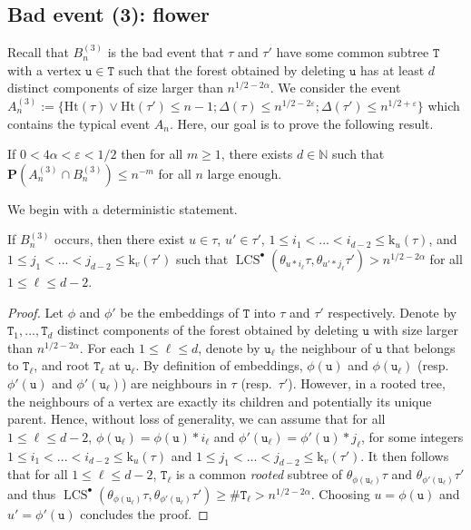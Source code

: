 \documentclass[11pt,reqno]{amsart}
\newcommand{\N}{\mathbb{N}}
\newcommand{\1}{\mathbf{1}}
\newcommand{\0}{\mathbf{0}}
\newcommand{\ttT}{\mathtt{T}}
\newcommand{\ttu}{\mathtt{u}}
\newcommand{\prob}{\mathbf{P}}
\newcommand{\Ht}{\mathrm{Ht}}
\newcommand{\rk}{\mathrm{k}}
\newcommand{\LCS}{\operatorname{LCS}}
\begin{document}
\subsection{Bad event (3): flower}
Recall that $B_n^{(3)}$ is the bad event that $\tau$ and $\tau'$ have some common subtree $\ttT$ with a vertex $\ttu \in \ttT$ such that the forest obtained by deleting $\ttu$ has at least $d$ distinct components of size larger than $n^{1/2-2\alpha}$. We consider the event $A_n^{(3)}:=\{\Ht(\tau)\vee\Ht(\tau')\leq n-1 ; \Delta(\tau)\leq n^{1/2-2\varepsilon} ; \Delta(\tau')\leq n^{1/2+\varepsilon}\}$ which contains the typical event $A_n$. Here, our goal is to prove the following result. 

\begin{prop}
\label{prop:no_flowers}
    If $0 < 4\alpha < \varepsilon < 1/2$ then for all $m \geq 1$, there exists $d \in \N$ such that $\prob(A_n^{(3)}\cap B_n^{(3)}) \leq n^{-m}$ for all $n$ large enough.
\end{prop}

We begin with a deterministic statement.

\begin{lem}
\label{deter-lemma:no_flowers}
If $B_n^{(3)}$ occurs, then there exist $u \in \tau$, $u' \in \tau'$, $1 \leq i_1 < ... < i_{d-2} \leq \rk_{u}(\tau)$, and $1 \leq j_1 < ... < j_{d-2} \leq \rk_{v}(\tau')$ such that $\LCS^\bullet(\theta_{u*i_\ell}\tau,\theta_{u'*j_\ell}\tau') > n^{1/2-2\alpha}$ for all $1 \leq \ell \leq d-2$.
\end{lem}

\begin{proof}
Let $\phi$ and $\phi'$ be the embeddings of $\ttT$ into $\tau$ and $\tau'$ respectively. Denote by $\ttT_1,...,\ttT_d$ distinct components of the forest obtained by deleting $\ttu$ with size larger than $n^{1/2-2\alpha}$. For each $1\leq \ell\leq d$, denote by $\ttu_\ell$ the neighbour of $\ttu$ that belongs to $\ttT_\ell$, and root $\ttT_\ell$ at $\ttu_\ell$. By definition of embeddings, $\phi(\ttu)$ and $\phi(\ttu_\ell)$ (resp.~$\phi'(\ttu)$ and $\phi'(\ttu_\ell)$) are neighbours in $\tau$ (resp.~$\tau'$). However, in a rooted tree, the neighbours of a vertex are exactly its children and potentially its unique parent. Hence, without loss of generality, we can assume that for all $1\leq \ell\leq d-2$, $\phi(\ttu_\ell)=\phi(\ttu)*i_\ell$ and $\phi'(\ttu_\ell)=\phi'(\ttu)*j_\ell$, for some integers $1 \leq i_1 < ... < i_{d-2} \leq \rk_{u}(\tau)$ and $1 \leq j_1 < ... < j_{d-2} \leq \rk_{v}(\tau')$. It then follows that for all $1\leq \ell\leq d-2$, $\ttT_\ell$ is a common \emph{rooted} subtree of $\theta_{\phi(\ttu_\ell)}\tau$ and $\theta_{\phi'(\ttu_\ell)}\tau'$ and thus $\LCS^\bullet(\theta_{\phi(\ttu_\ell)}\tau,\theta_{\phi'(\ttu_\ell)}\tau')\geq \#\ttT_\ell>n^{1/2-2\alpha}$. Choosing $u=\phi(\ttu)$ and $u'=\phi'(\ttu)$ concludes the proof.
\end{proof}
\end{document}
